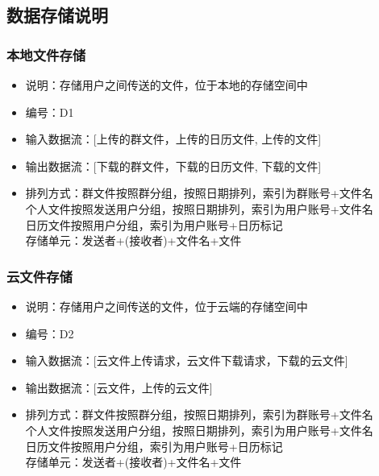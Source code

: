         \subsection{数据存储说明}
            \subsubsection{本地文件存储}
            \begin{itemize}
                \item 说明：存储用户之间传送的文件，位于本地的存储空间中
                \item 编号：D1
                \item 输入数据流：[上传的群文件，上传的日历文件, 上传的文件]
                \item 输出数据流：[下载的群文件，下载的日历文件, 下载的文件]
                \item 排列方式：群文件按照群分组，按照日期排列，索引为群账号+文件名\\
                               个人文件按照发送用户分组，按照日期排列，索引为用户账号+文件名\\
                               日历文件按照用户分组，索引为用户账号+日历标记\\
                               存储单元：发送者+(接收者)+文件名+文件\\
            \end{itemize}
            \subsubsection{云文件存储}
            \begin{itemize}
                \item 说明：存储用户之间传送的文件，位于云端的存储空间中
                \item 编号：D2
                \item 输入数据流：[云文件上传请求，云文件下载请求，下载的云文件]
                \item 输出数据流：[云文件，上传的云文件]
                \item 排列方式：群文件按照群分组，按照日期排列，索引为群账号+文件名\\
                               个人文件按照发送用户分组，按照日期排列，索引为用户账号+文件名\\
                               日历文件按照用户分组，索引为用户账号+日历标记\\
                               存储单元：发送者+(接收者)+文件名+文件\\
            \end{itemize}
